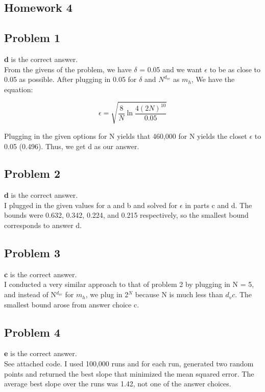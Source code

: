 \documentclass[12 pt]{article}
\begin{document}
	\begin{center}
		\section*{Homework 4}
	\end{center}
	
	
	\subsection*{Problem 1}	
	\textbf{d} is the correct answer. \\
	From the givens of the problem, we have $\delta$ = 0.05 and we want $\epsilon$ to be as close to 0.05 as possible. After plugging in 0.05 for $\delta$ and $N^{d_{vc}}$ as $m_h$,
	We have the equation: 
	
	\[\epsilon = \sqrt{\frac{8}{N} \ln {\frac{4  (2N)^{10}}{0.05}}}\]
	
	\noindent Plugging in the given options for N yields that 460,000 for N yields the closet $\epsilon$ to 0.05 (0.496). Thus, we get d as our answer.

	\subsection*{Problem 2}
	\textbf{d} is the correct answer. \\
	I plugged in the given values for a and b and solved for $\epsilon$ in parts c and d. The bounds were 0.632, 0.342, 0.224, and 0.215 respectively, so the smallest bound corresponds to answer d.

	
	\subsection*{Problem 3}
	\textbf{c} is the correct answer.\\
	I conducted a very similar approach to that of problem 2 by plugging in N = 5, and instead of N$^{d_{vc}}$ for $m_h$, we plug in 2$^N$ because N is much less than $d_vc$. The smallest bound arose from answer choice c.
	
	\subsection*{Problem 4}
	\textbf{e} is the correct answer.\\
	See attached code. I used 100,000 runs and for each run, generated two random points and returned the best slope that minimized the mean squared error. The average best slope over the runs was 1.42, not one of the answer choices. 
\end{document}
